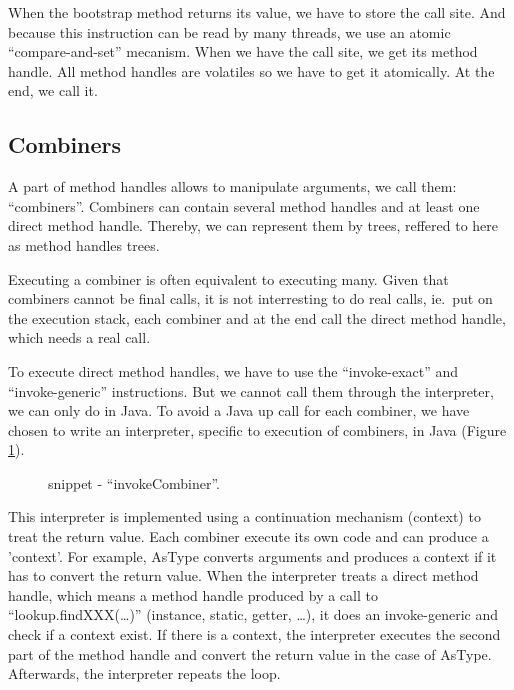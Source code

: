 \documentclass{sig-alternate}
\begin{document}
      When the bootstrap method returns its value, we have to store the call site.
      And because this instruction can be read by many threads, we use an atomic ``compare-and-set'' mecanism.
      When we have the call site, we get its method handle.
      All method handles are volatiles so we have to get it atomically.
      At the end, we call it.

    \subsection{Combiners}
    \label{combiners}

      A part of method handles allows to manipulate arguments, we call them: ``combiners''.
      Combiners can contain several method handles and at least one direct method handle.
      Thereby, we can represent them by trees, reffered to here as method handles trees.

      Executing a combiner is often equivalent to executing many.
      Given that combiners cannot be final calls,
      it is not interresting to do real calls, ie.~put on the execution stack,
      each combiner and at the end call the direct method handle, which needs a real call.

      To execute direct method handles, we have to use the ``invoke-exact'' and ``invoke-generic'' instructions.
      But we cannot call them through the interpreter, we can only do in Java.
      To avoid a Java up call for each combiner, we have chosen to write an interpreter,
      specific to execution of combiners, in Java (Figure \ref{implINTERP}).

      \begin{figure}[!h]
        \centering \vspace{-1em}
        \caption{snippet - ``invokeCombiner''.}
        \label{implINTERP}
      \end{figure}

      This interpreter is implemented using a continuation mechanism (context) to treat the return value.
      Each combiner execute its own code and can produce a 'context'.
      For example, AsType converts arguments and produces a context if it has to convert the return value.
      When the interpreter treats a direct method handle,
      which means a method handle produced by a call to ``lookup.findXXX(\dots)'' (instance, static, getter, \dots),
      it does an invoke-generic and check if a context exist.
      If there is a context, the interpreter executes the second part of the method handle
      and convert the return value in the case of AsType.
      Afterwards, the interpreter repeats the loop.
\end{document}
